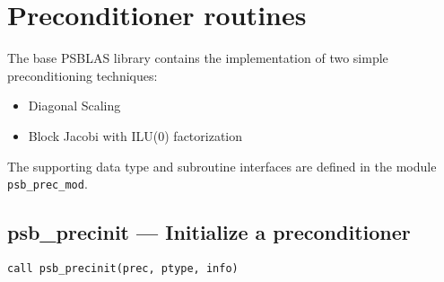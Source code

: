 \section{Preconditioner routines}
\label{sec:precs}

\label{sec:psprecs}
The base PSBLAS library  contains the implementation of two simple
preconditioning techniques:
\begin{itemize}
\item Diagonal Scaling
\item Block Jacobi with ILU(0) factorization
\end{itemize}
The supporting data type and subroutine interfaces are defined in the
module  \verb|psb_prec_mod|.





\clearpage\subsection*{psb\_precinit --- Initialize a  preconditioner}

\begin{verbatim}
call psb_precinit(prec, ptype, info)
\end{verbatim}


